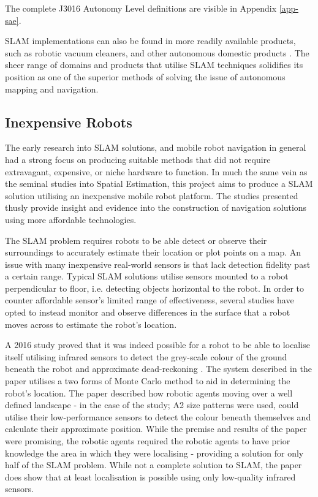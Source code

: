 The complete J3016 Autonomy Level definitions are visible in Appendix
\ref{app-sae}. 


SLAM implementations can also be found in more readily available products,
such as robotic vacuum cleaners, and other autonomous  domestic products
\cite{forlizzi2006service}.
The sheer range of domains and products that utilise SLAM techniques
solidifies its position as one of the superior methods of solving the issue of
autonomous mapping and navigation.



\subsection{Inexpensive Robots}
The early research into SLAM solutions, and mobile robot navigation in general
had a strong focus on producing suitable methods that did not require
extravagant, expensive, or niche hardware to function.
In much the same vein as the seminal studies into Spatial Estimation, this
project aims to produce a SLAM solution utilising an inexpensive mobile
robot platform.
The studies presented thusly provide insight and evidence into the
construction of navigation solutions using more affordable technologies.

The SLAM problem requires robots to be able detect or observe their
surroundings to accurately estimate their location or plot points on a map.
An issue with many inexpensive real-world sensors is that lack detection
fidelity past a certain range.
Typical SLAM solutions utilise sensors mounted to a robot perpendicular to
floor, i.e. detecting objects horizontal to the robot.
In order to counter affordable sensor's limited range of effectiveness, several
studies have opted to instead monitor and observe differences in the surface
that a robot moves across to estimate the robot's location.

A 2016 study proved that it was indeed possible for a robot to be able to
localise itself utilising infrared sensors to detect the grey-scale colour of
the ground beneath the robot and approximate dead-reckoning \cite{Wang2016}.
The system described in the paper utilises a two forms of  Monte Carlo
method to aid in determining the robot's location.
The paper described how robotic agents moving over a well defined landscape -
in the case of the study; A2 size patterns were used, could utilise
their low-performance sensors to detect the colour beneath themselves and
calculate their approximate position.
While the premise and results of the paper were promising, the robotic agents
required the robotic agents to have prior knowledge the area in which they
were localising - providing a solution for only half of the SLAM problem.
While not a complete solution to SLAM, the paper does show that at least
localisation is possible using only low-quality infrared sensors.


